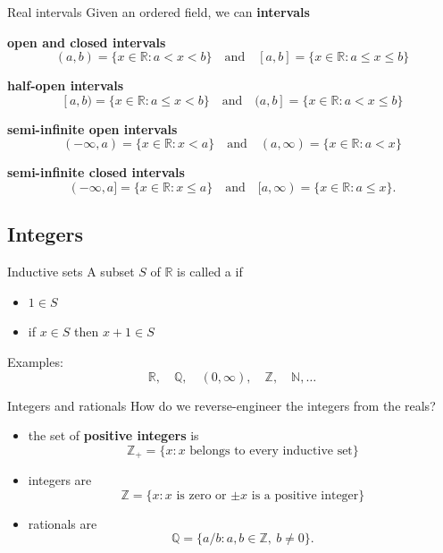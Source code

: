 \documentclass{beamer}
\begin{document}
\begin{frame}{Real intervals}
Given an ordered field, we can \textbf{intervals}
\begin{itemize}
{\small
\pause
\item \textbf{open and closed intervals}
$$(a,b) = \{x\in \mathbb{R}: a < x < b\}
\quad\text{and}\quad
[a,b] = \{x\in \mathbb{R}: a \leq x \leq b\}$$
\pause
\item \textbf{half-open intervals}
$$
[a,b) = \{x\in \mathbb{R}: a \leq x < b\}
\quad\text{and}\quad
(a,b] = \{x\in \mathbb{R}: a < x \leq b\}
$$
\pause
\item \textbf{semi-infinite open intervals}
$$
(-\infty, a) = \{x\in\mathbb{R}: x < a\}
\quad\text{and}\quad
(a, \infty)  = \{x\in\mathbb{R}: a < x\}$$
\pause
\item \textbf{semi-infinite closed intervals}
$$
(-\infty, a] = \{x\in\mathbb{R}: x \leq a\}
\quad\text{and}\quad
[a, \infty)  = \{x\in\mathbb{R}: a \leq x\}.$$
}
\end{itemize}
\end{frame}

\subsection{Integers}

\begin{frame}{Inductive sets}
A subset $S$ of $\mathbb{R}$ is called a  if
\begin{itemize}
\item $1\in S$
\item if $x\in S$ then $x+1\in S$ 
\end{itemize}
\pause
Examples:
$$\mathbb{R},\quad\mathbb{Q},\quad(0,\infty),\quad\mathbb{Z},\quad\mathbb{N},\dots$$
\end{frame}

\begin{frame}{Integers and rationals}
How do we reverse-engineer the integers from the reals?
\begin{itemize}
\pause
\item the set of \textbf{positive integers} is
$$\mathbb{Z}_+ = \{x: \text{$x$ belongs to every inductive set}\}$$
\pause
\item integers are
$$\mathbb{Z} = \{x: \text{$x$ is zero or $\pm x$ is a positive integer}\}$$
\pause
\item rationals are
$$\mathbb{Q} = \{a/b: a,b\in\mathbb{Z},\ b\neq 0\}.$$
\end{itemize}
\end{frame}
\end{document}
